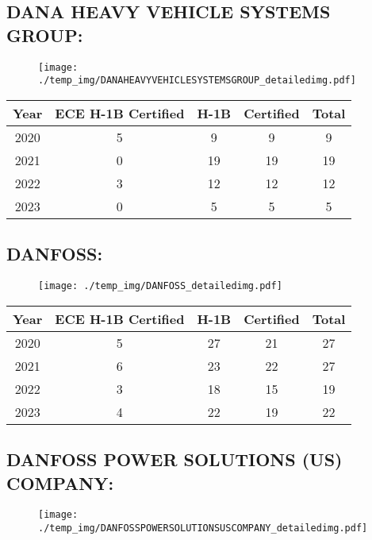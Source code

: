\documentclass{article}%
\begin{document}
%
\newpage%
\subsection{DANA HEAVY VEHICLE SYSTEMS GROUP:}%
\label{subsec:DANAHEAVYVEHICLESYSTEMSGROUP}%
\label{DANAHEAVYVEHICLESYSTEMSGROUPdetailed}%


\begin{figure}[htbp]%
\centering%
\texttt{[image: ./temp\_img/DANAHEAVYVEHICLESYSTEMSGROUP\_detailedimg.pdf]}%
\end{figure}

%
\begin{longtable}{c|c|c|c|c}%
\hline%
Year&ECE H{-}1B Certified&H{-}1B&Certified&Total\\%
\hline%
2020&5&9&9&9\\%
\hline%
2021&0&19&19&19\\%
\hline%
2022&3&12&12&12\\%
\hline%
2023&0&5&5&5\\%
\hline%
\end{longtable}

%
\newpage%
\subsection{DANFOSS:}%
\label{subsec:DANFOSS}%
\label{DANFOSSdetailed}%


\begin{figure}[htbp]%
\centering%
\texttt{[image: ./temp\_img/DANFOSS\_detailedimg.pdf]}%
\end{figure}

%
\begin{longtable}{c|c|c|c|c}%
\hline%
Year&ECE H{-}1B Certified&H{-}1B&Certified&Total\\%
\hline%
2020&5&27&21&27\\%
\hline%
2021&6&23&22&27\\%
\hline%
2022&3&18&15&19\\%
\hline%
2023&4&22&19&22\\%
\hline%
\end{longtable}

%
\newpage%
\subsection{DANFOSS POWER SOLUTIONS (US) COMPANY:}%
\label{subsec:DANFOSSPOWERSOLUTIONS(US)COMPANY}%
\label{DANFOSSPOWERSOLUTIONSUSCOMPANYdetailed}%


\begin{figure}[htbp]%
\centering%
\texttt{[image: ./temp\_img/DANFOSSPOWERSOLUTIONSUSCOMPANY\_detailedimg.pdf]}%
\end{figure}
\end{document}
